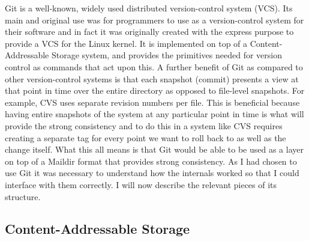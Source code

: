Git\cite{code_git} is a well-known, widely used distributed version-control system (VCS). Its main and original use was for programmers to use as a version-control system for their software and in fact it was originally created with the express purpose to provide a VCS for the Linux kernel\cite{chacon2014git}. It is implemented on top of a Content-Addressable Storage system, and provides the primitives needed for version control as commands that act upon this. A further benefit of Git as compared to other version-control systems is that each snapshot (commit) presents a view at that point in time over the entire directory as opposed to file-level snapshots. For example, CVS\cite{code_cvs} uses separate revision numbers per file. This is beneficial because having entire snapshots of the system at any particular point in time is what will provide the strong consistency and to do this in a system like CVS requires creating a separate tag for every point we want to roll back to as well as the change itself. What this all means is that Git would be able to be used as a layer on top of a Maildir format that provides strong consistency. As I had chosen to use Git it was necessary to understand how the internals worked so that I could interface with them correctly. I will now describe the relevant pieces of its structure.

\subsection{Content-Addressable Storage}

